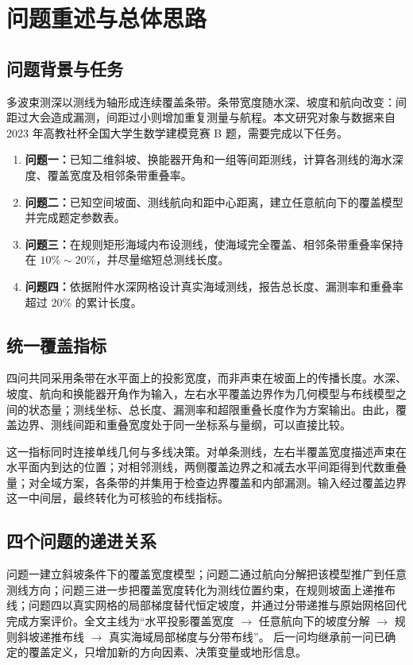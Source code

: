 \section{问题重述与总体思路}

\subsection{问题背景与任务}

多波束测深以测线为轴形成连续覆盖条带。条带宽度随水深、坡度和航向改变：间距过大会造成漏测，间距过小则增加重复测量与航程。本文研究对象与数据来自 2023 年高教社杯全国大学生数学建模竞赛 B 题\cite{prob}，需要完成以下任务。

\begin{enumerate}
  \item \textbf{问题一：}已知二维斜坡、换能器开角和一组等间距测线，计算各测线的海水深度、覆盖宽度及相邻条带重叠率。
  \item \textbf{问题二：}已知空间坡面、测线航向和距中心距离，建立任意航向下的覆盖模型并完成题定参数表。
  \item \textbf{问题三：}在规则矩形海域内布设测线，使海域完全覆盖、相邻条带重叠率保持在 $10\%\sim20\%$，并尽量缩短总测线长度。
  \item \textbf{问题四：}依据附件水深网格设计真实海域测线，报告总长度、漏测率和重叠率超过 $20\%$ 的累计长度。
\end{enumerate}

\subsection{统一覆盖指标}

四问共同采用条带在水平面上的投影宽度，而非声束在坡面上的传播长度。水深、坡度、航向和换能器开角作为输入，左右水平覆盖边界作为几何模型与布线模型之间的状态量；测线坐标、总长度、漏测率和超限重叠长度作为方案输出。由此，覆盖边界、测线间距和重叠宽度处于同一坐标系与量纲，可以直接比较。

这一指标同时连接单线几何与多线决策。对单条测线，左右半覆盖宽度描述声束在水平面内到达的位置；对相邻测线，两侧覆盖边界之和减去水平间距得到代数重叠量；对全域方案，各条带的并集用于检查边界覆盖和内部漏测。输入经过覆盖边界这一中间层，最终转化为可核验的布线指标。

\subsection{四个问题的递进关系}

问题一建立斜坡条件下的覆盖宽度模型；问题二通过航向分解把该模型推广到任意测线方向；问题三进一步把覆盖宽度转化为测线位置约束，在规则坡面上递推布线；问题四以真实网格的局部梯度替代恒定坡度，并通过分带递推与原始网格回代完成方案评价。全文主线为“水平投影覆盖宽度 $\rightarrow$ 任意航向下的坡度分解 $\rightarrow$ 规则斜坡递推布线 $\rightarrow$ 真实海域局部梯度与分带布线”。
后一问均继承前一问已确定的覆盖定义，只增加新的方向因素、决策变量或地形信息。
